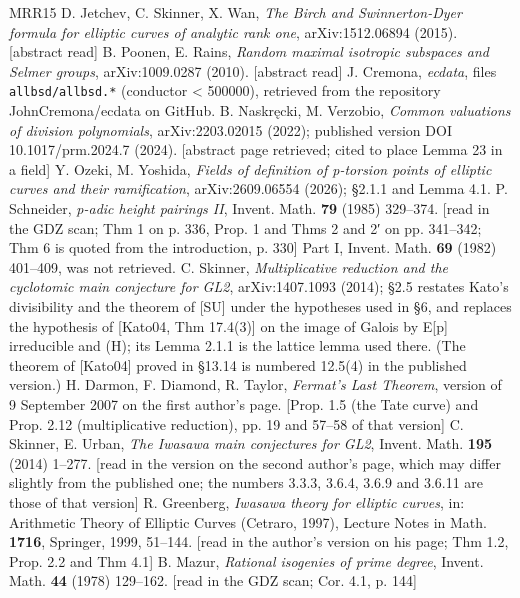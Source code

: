 \documentclass[11pt,a4paper]{article}
\theoremstyle{named}
\begin{document}
\begin{thebibliography}{MRR15}
 D. Jetchev, C. Skinner, X. Wan, \textit{The Birch and Swinnerton-Dyer formula for elliptic curves of analytic rank one}, arXiv:1512.06894 (2015). [abstract read]
 B. Poonen, E. Rains, \textit{Random maximal isotropic subspaces and Selmer groups}, arXiv:1009.0287 (2010). [abstract read]
 J. Cremona, \textit{ecdata}, files \texttt{allbsd/allbsd.\allowbreak{}*} (conductor \textless{} 500000), retrieved from the repository JohnCremona/ecdata on GitHub.
 B. Naskręcki, M. Verzobio, \textit{Common valuations of division polynomials}, arXiv:2203.02015 (2022); published version DOI 10.1017/prm.2024.7 (2024). [abstract page retrieved; cited to place Lemma 23 in a field]
 Y. Ozeki, M. Yoshida, \textit{Fields of definition of p-torsion points of elliptic curves and their ramification}, arXiv:2609.06554 (2026); §2.1.1 and Lemma 4.1.
 P. Schneider, \textit{p-adic height pairings II}, Invent. Math. \textbf{79} (1985) 329–374. [read in the GDZ scan; Thm 1 on p. 336, Prop. 1 and Thms 2 and 2′ on pp. 341–342; Thm 6 is quoted from the introduction, p. 330] Part I, Invent. Math. \textbf{69} (1982) 401–409, was not retrieved.
 C. Skinner, \textit{Multiplicative reduction and the cyclotomic main conjecture for GL2}, arXiv:1407.1093 (2014); §2.5 restates Kato's divisibility and the theorem of [SU] under the hypotheses used in §6, and replaces the hypothesis of [Kato04, Thm 17.4(3)] on the image of Galois by E[p] irreducible and (H); its Lemma 2.1.1 is the lattice lemma used there. (The theorem of [Kato04] proved in §13.14 is numbered 12.5(4) in the published version.)
 H. Darmon, F. Diamond, R. Taylor, \textit{Fermat's Last Theorem}, version of 9 September 2007 on the first author's page. [Prop. 1.5 (the Tate curve) and Prop. 2.12 (multiplicative reduction), pp. 19 and 57–58 of that version]
 C. Skinner, E. Urban, \textit{The Iwasawa main conjectures for GL2}, Invent. Math. \textbf{195} (2014) 1–277. [read in the version on the second author's page, which may differ slightly from the published one; the numbers 3.3.3, 3.6.4, 3.6.9 and 3.6.11 are those of that version]
 R. Greenberg, \textit{Iwasawa theory for elliptic curves}, in: Arithmetic Theory of Elliptic Curves (Cetraro, 1997), Lecture Notes in Math. \textbf{1716}, Springer, 1999, 51–144. [read in the author's version on his page; Thm 1.2, Prop. 2.2 and Thm 4.1]
 B. Mazur, \textit{Rational isogenies of prime degree}, Invent. Math. \textbf{44} (1978) 129–162. [read in the GDZ scan; Cor. 4.1, p. 144]

\end{thebibliography}
\end{document}
